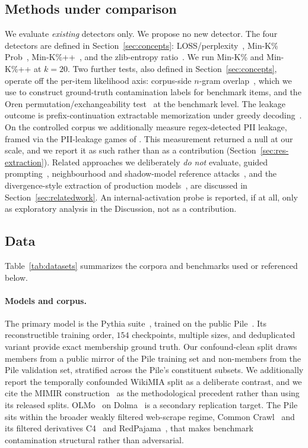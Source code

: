 \subsection{Methods under comparison}
We evaluate \emph{existing} detectors only. We propose no new detector. The four
detectors are defined in Section~\ref{sec:concepts}: LOSS/perplexity~\citep{yeom2018privacy},
Min-K\% Prob~\citep{shi2024detecting}, Min-K\%++~\citep{zhang2025minkpp}, and the
zlib-entropy ratio~\citep{carlini2021extracting}. We run Min-K\% and Min-K\%++ at $k=20$.
Two further tests, also defined in Section~\ref{sec:concepts}, operate off the per-item
likelihood axis: corpus-side $n$-gram overlap~\citep{brown2020gpt3}, which we use to
construct ground-truth contamination labels for benchmark items, and the Oren
permutation/exchangeability test~\citep{oren2024proving} at the benchmark level. The
leakage outcome is prefix-continuation extractable memorization under greedy
decoding~\citep{carlini2023quantifying}. On the controlled corpus we additionally measure
regex-detected PII leakage, framed via the PII-leakage games of
\citet{lukas2023pii}. This measurement returned a null at our scale, and we report it as
such rather than as a contribution (Section~\ref{sec:res-extraction}). Related approaches
we deliberately \emph{do not}
evaluate, guided prompting~\citep{golchin2024timetravel}, neighbourhood and shadow-model
reference attacks~\citep{mattern2023neighbourhood,shokri2017membership}, and the
divergence-style extraction of production
models~\citep{nasr2025scalable}, are discussed in Section~\ref{sec:relatedwork}.
An internal-activation probe is reported, if at all, only as exploratory
analysis in the Discussion, not as a contribution.

\subsection{Data}
Table~\ref{tab:datasets} summarizes the corpora and benchmarks used or referenced below.

\paragraph{Models and corpus.} The primary model is the Pythia
suite~\citep{biderman2023pythia}, trained on the public Pile~\citep{gao2020pile}. Its
reconstructible training order, $154$ checkpoints, multiple sizes, and deduplicated
variant provide exact membership ground truth. Our confound-clean split draws members
from a public mirror of the Pile training set and non-members from the Pile validation
set, stratified across the Pile's constituent subsets. We additionally report the
temporally confounded WikiMIA split as a deliberate contrast, and we cite the MIMIR
construction~\citep{duan2024mia} as the methodological precedent rather than using its
released splits. OLMo~\citep{groeneveld2024olmo} on Dolma~\citep{soldaini2024dolma} is a
secondary replication target. The Pile sits within the broader weakly filtered
web-scrape regime, Common Crawl~\citep{commoncrawl} and its filtered derivatives
C4~\citep{raffel2020c4,dodge2021c4} and RedPajama~\citep{weber2024redpajama}, that makes
benchmark contamination structural rather than adversarial.

